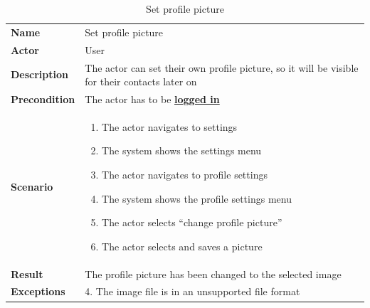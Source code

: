 \begin{table}[ht]
    \caption{Set profile picture}
    \begin{tabular}{|L{5cm}|L{10cm}|}
        \toprule
        \textbf{Name}         & Set profile picture                                                                            \\
        \textbf{Actor}        & User                                                                                           \\
        \textbf{Description}  & The actor can set their own profile picture, so it will be visible for their contacts later on \\
        \textbf{Precondition} & The actor has to be \textbf{\hyperref[tab:table8]{logged in}}                                  \\
        \textbf{Scenario} &
        \vspace{-0.75cm}
        \begin{enumerate}
            \setlength\itemsep{-0.5em}
            \item The actor navigates to settings
            \item The system shows the settings menu
            \item The actor navigates to profile settings
            \item The system shows the profile settings menu
            \item The actor selects \enquote{change profile picture}
            \item The actor selects and saves a picture
        \end{enumerate} \\[-0.5cm]
        \textbf{Result}       & The profile picture has been changed to the selected image                                     \\
        \textbf{Exceptions} & 4.
        The image file is in an unsupported file format \\
        \bottomrule
    \end{tabular}
    \label{tab:table14}
\end{table}

